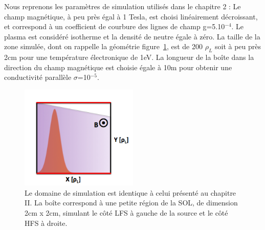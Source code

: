 \begin{refsection}
Nous reprenons les paramètres de simulation utilisés dans le chapitre 2 : Le
champ magnétique, à peu près égal à 1 Tesla, est choisi linéairement
décroissant, et correspond à un coefficient de courbure des lignes de champ
g=5.10$^{-4}$.
Le plasma est considéré isotherme et la densité de neutre égale à zéro. La
taille de la zone simulée, dont on rappelle la géométrie
figure~\ref{4-TokamGeometrie}, est de 200 $\rho_L$ soit à peu près 2cm pour une
température électronique de 1eV. La longueur de la boîte dans la direction
du champ magnétique est choisie égale à 10m pour obtenir une conductivité
parallèle $\sigma$=10$^{-5}$.

\begin{figure}[!htbp]
\centering
\includegraphics[width=0.5\textwidth]{figures/4-TokamGeometrie.png}
\caption{Le domaine de simulation est identique à celui présenté au
chapitre II. La boîte correspond à une petite région de la SOL, de dimension
2cm x 2cm, simulant le côté LFS à gauche de la source et le côté HFS à droite.
\label{4-TokamGeometrie}}
\end{figure}



\end{refsection}
